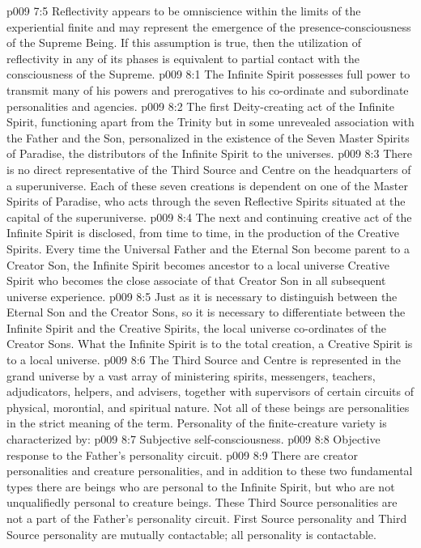 \vs p009 7:5 Reflectivity appears to be omniscience within the limits of the experiential finite and may represent the emergence of the presence\hyp{}consciousness of the Supreme Being. If this assumption is true, then the utilization of reflectivity in any of its phases is equivalent to partial contact with the consciousness of the Supreme.
\vs p009 8:1 The Infinite Spirit possesses full power to transmit many of his powers and prerogatives to his co\hyp{}ordinate and subordinate personalities and agencies.
\vs p009 8:2 The first Deity\hyp{}creating act of the Infinite Spirit, functioning apart from the Trinity but in some unrevealed association with the Father and the Son, personalized in the existence of the Seven Master Spirits of Paradise, the distributors of the Infinite Spirit to the universes.
\vs p009 8:3 There is no direct representative of the Third Source and Centre on the headquarters of a superuniverse. Each of these seven creations is dependent on one of the Master Spirits of Paradise, who acts through the seven Reflective Spirits situated at the capital of the superuniverse.
\vs p009 8:4 The next and continuing creative act of the Infinite Spirit is disclosed, from time to time, in the production of the Creative Spirits. Every time the Universal Father and the Eternal Son become parent to a Creator Son, the Infinite Spirit becomes ancestor to a local universe Creative Spirit who becomes the close associate of that Creator Son in all subsequent universe experience.
\vs p009 8:5 Just as it is necessary to distinguish between the Eternal Son and the Creator Sons, so it is necessary to differentiate between the Infinite Spirit and the Creative Spirits, the local universe co\hyp{}ordinates of the Creator Sons. What the Infinite Spirit is to the total creation, a Creative Spirit is to a local universe.
\vs p009 8:6 \pc The Third Source and Centre is represented in the grand universe by a vast array of ministering spirits, messengers, teachers, adjudicators, helpers, and advisers, together with supervisors of certain circuits of physical, morontial, and spiritual nature. Not all of these beings are personalities in the strict meaning of the term. Personality of the finite\hyp{}creature variety is characterized by:
\vs p009 8:7 \bibnobreakspace Subjective self\hyp{}consciousness.
\vs p009 8:8 \bibnobreakspace Objective response to the Father’s personality circuit.
\vs p009 8:9 \pc There are creator personalities and creature personalities, and in addition to these two fundamental types there are  beings who are personal to the Infinite Spirit, but who are not unqualifiedly personal to creature beings. These Third Source personalities are not a part of the Father’s personality circuit. First Source personality and Third Source personality are mutually contactable; all personality is contactable.
